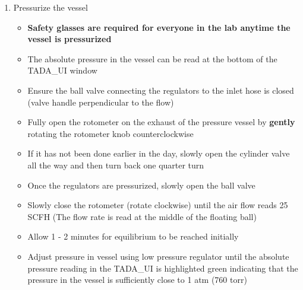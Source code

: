 \documentclass[letterpaper,11pt]{article}
\begin{document}
\begin{enumerate}
\begin{itemize}
        \end{itemize}    
    \item Pressurize the vessel
        \begin{itemize}
        \item \textbf{Safety glasses are required for everyone in the lab 
            anytime the vessel is pressurized}
        \item The absolute pressure in the vessel can be read at the bottom of 
            the TADA\_UI window
        \item Ensure the ball valve connecting the regulators to the inlet hose
            is closed (valve handle perpendicular to the flow)
        \item Fully open the rotometer on the exhaust of the pressure vessel by 
            \textbf{gently} rotating the rotometer knob counterclockwise 
        \item If it has not been done earlier in the day, slowly open the 
			cylinder valve all the way and then turn back one quarter turn
        \item Once the regulators are pressurized, slowly open the ball valve
        \item Slowly close the rotometer (rotate clockwise) until the air flow 
            reads 25 SCFH (The flow rate is read at the middle of the floating ball)
        \item Allow 1 - 2 minutes for equilibrium to be reached initially
        \item Adjust pressure in vessel using low pressure regulator until the    
            absolute pressure reading in the TADA\_UI is highlighted green 
            indicating that the pressure in the vessel is sufficiently close 
            to 1 atm (760 torr)
        

\end{itemize}
\end{enumerate}
\end{document}
